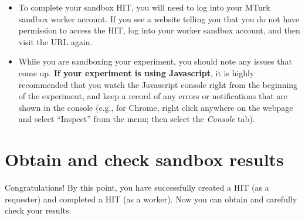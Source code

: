 \documentclass{article}
\begin{document}
\begin{itemize}
  \item To complete your sandbox HIT, you will need to log into your MTurk sandbox worker account. If you see a website telling you that you do not have permission to access the HIT, log into your worker sandbox account, and then visit the URL again.
  \item While you are sandboxing your experiment, you should note any issues that come up. \textbf{If your experiment is using Javascript}, it is highly recommended that you watch the Javascript console right from the beginning of the experiment, and keep a record of any errors or notifications that are shown in the console (e.g., for Chrome, right click anywhere on the webpage and select ``Inspect'' from the menu; then select the {\it Console} tab). 

\end{itemize}


\section{Obtain and check sandbox results}

Congratulations! By this point, you have successfully created a HIT (as a requester) and completed a HIT (as a worker). Now you can obtain and carefully check your results. 
\end{document}
